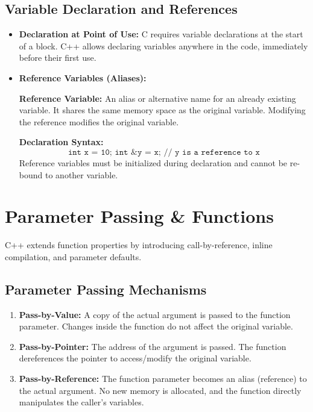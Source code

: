 \documentclass[12pt,a4paper]{article}
\begin{document}
\subsection{Variable Declaration and References}
\begin{itemize}[leftmargin=*, itemsep=3pt]
  \item \textbf{Declaration at Point of Use:} C requires variable declarations at the start of a block. C++ allows declaring variables anywhere in the code, immediately before their first use.
  \item \textbf{Reference Variables (Aliases):}
    \begin{tcolorbox}[defbox]
    \textbf{Reference Variable:} An alias or alternative name for an already existing variable. It shares the same memory space as the original variable. Modifying the reference modifies the original variable.
    \end{tcolorbox}
    \textbf{Declaration Syntax:}
    \begin{equation}
      \texttt{int x = 10; int \&y = x; // y is a reference to x}
    \end{equation}
    Reference variables must be initialized during declaration and cannot be re-bound to another variable.
\end{itemize}

\section{Parameter Passing \& Functions}

C++ extends function properties by introducing call-by-reference, inline compilation, and parameter defaults.

\subsection{Parameter Passing Mechanisms}
\begin{enumerate}[label=\textbf{\arabic*.}, leftmargin=*, itemsep=4pt]
  \item \textbf{Pass-by-Value:} A copy of the actual argument is passed to the function parameter. Changes inside the function do not affect the original variable.
  \item \textbf{Pass-by-Pointer:} The address of the argument is passed. The function dereferences the pointer to access/modify the original variable.
  \item \textbf{Pass-by-Reference:} The function parameter becomes an alias (reference) to the actual argument. No new memory is allocated, and the function directly manipulates the caller's variables.
\end{enumerate}
\end{document}
